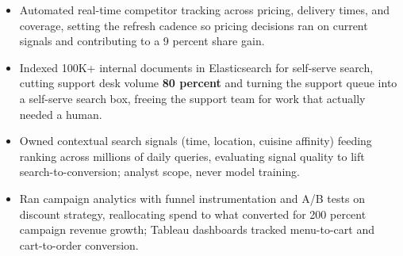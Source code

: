 \documentclass[letterpaper,10pt]{article}
\begin{document}
\pagebreak
{}
\begin{itemize}
\item Automated real-time competitor tracking across pricing, delivery times, and coverage, setting the refresh cadence so pricing decisions ran on current signals and contributing to a 9 percent share gain.
\item Indexed 100K+ internal documents in Elasticsearch for self-serve search, cutting support desk volume \textbf{80 percent} and turning the support queue into a self-serve search box, freeing the support team for work that actually needed a human.
\item Owned contextual search signals (time, location, cuisine affinity) feeding ranking across millions of daily queries, evaluating signal quality to lift search-to-conversion; analyst scope, never model training.
\item Ran campaign analytics with funnel instrumentation and A/B tests on discount strategy, reallocating spend to what converted for 200 percent campaign revenue growth; Tableau dashboards tracked menu-to-cart and cart-to-order conversion.
\end{itemize}
\end{document}
